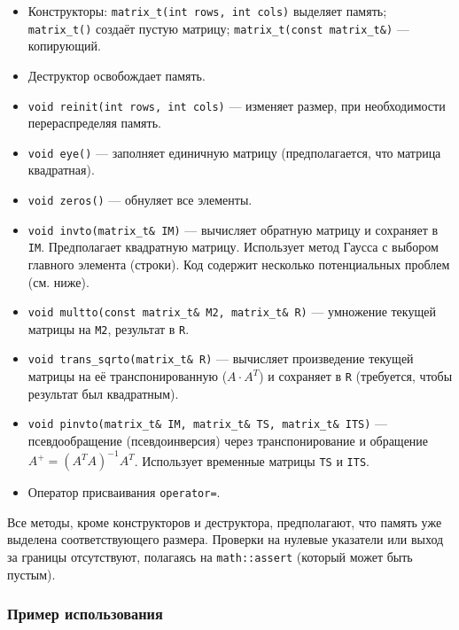\documentclass[a4paper,12pt]{article}
\begin{document}
\begin{itemize}
    \item Конструкторы: \texttt{matrix\_t(int rows, int cols)} выделяет память; \texttt{matrix\_t()} создаёт пустую матрицу; \texttt{matrix\_t(const matrix\_t\&)} — копирующий.
    \item Деструктор освобождает память.
    \item \texttt{void reinit(int rows, int cols)} — изменяет размер, при необходимости перераспределяя память.
    \item \texttt{void eye()} — заполняет единичную матрицу (предполагается, что матрица квадратная).
    \item \texttt{void zeros()} — обнуляет все элементы.
    \item \texttt{void invto(matrix\_t\& IM)} — вычисляет обратную матрицу и сохраняет в \texttt{IM}. Предполагает квадратную матрицу. Использует метод Гаусса с выбором главного элемента (строки). Код содержит несколько потенциальных проблем (см. ниже).
    \item \texttt{void multto(const matrix\_t\& M2, matrix\_t\& R)} — умножение текущей матрицы на \texttt{M2}, результат в \texttt{R}.
    \item \texttt{void trans\_sqrto(matrix\_t\& R)} — вычисляет произведение текущей матрицы на её транспонированную ($A \cdot A^T$) и сохраняет в \texttt{R} (требуется, чтобы результат был квадратным).
    \item \texttt{void pinvto(matrix\_t\& IM, matrix\_t\& TS, matrix\_t\& ITS)} — псевдообращение (псевдоинверсия) через транспонирование и обращение $A^+ = (A^T A)^{-1} A^T$. Использует временные матрицы \texttt{TS} и \texttt{ITS}.
    \item Оператор присваивания \texttt{operator=}.
\end{itemize}

Все методы, кроме конструкторов и деструктора, предполагают, что память уже выделена соответствующего размера. Проверки на нулевые указатели или выход за границы отсутствуют, полагаясь на \texttt{math::assert} (который может быть пустым).

\subsubsection{Пример использования}
\end{document}
